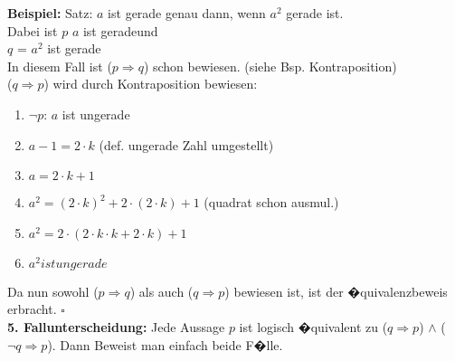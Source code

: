 \textbf{Beispiel:}
Satz: \glqq $a$ ist gerade genau dann, wenn $a^2$ gerade ist\grqq.\\
Dabei ist $p$  \glqq$a$ ist gerade\grqq\space und\\
$q$ = \glqq$a^2$ ist gerade\grqq\\
In diesem Fall ist ($p \Rightarrow q$) schon bewiesen. (siehe Bsp. Kontraposition)\\
($q \Rightarrow p$) wird durch Kontraposition bewiesen:
\begin{enumerate}
  \item $\neg p$: \glqq $a$ ist ungerade\grqq
  \item $a - 1 = 2 \cdot k$ (def. ungerade Zahl umgestellt)
  \item $a = 2 \cdot k + 1$
  \item $a^2 = (2 \cdot k)^2 + 2 \cdot (2 \cdot k) + 1$ (quadrat schon ausmul.)
  \item $a^2 = 2 \cdot (2 \cdot k \cdot k + 2 \cdot k) + 1$
  \item $a^2 ist ungerade$
\end{enumerate}
Da nun sowohl ($p \Rightarrow q$) als auch ($q \Rightarrow p$) bewiesen ist, ist der �quivalenzbeweis erbracht. $\square$
\\	
\textbf{5. Fallunterscheidung:} Jede Aussage $p$ ist logisch �quivalent zu ($q \Rightarrow p$) $\wedge$ ($\neg q \Rightarrow p$). Dann Beweist man einfach beide F�lle.

